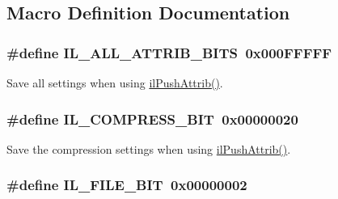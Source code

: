 \subsection{Macro Definition Documentation}
\hypertarget{group__il__bits_ga7e0d7d1e541cc94a58709ca8fe2924c1}{
\subsubsection[{I\+L\+\_\+\+A\+L\+L\+\_\+\+A\+T\+T\+R\+I\+B\+\_\+\+B\+I\+T\+S}]{\setlength{\rightskip}{0pt plus 5cm}\#define I\+L\+\_\+\+A\+L\+L\+\_\+\+A\+T\+T\+R\+I\+B\+\_\+\+B\+I\+T\+S~0x000\+F\+F\+F\+F\+F}}\label{group__il__bits_ga7e0d7d1e541cc94a58709ca8fe2924c1}


Save all settings when using \hyperlink{group__state_ga72e0879c71f59f06c35d2e2a10191fa8}{il\+Push\+Attrib()}. 

\hypertarget{group__il__bits_ga5b13962d3eddb7fdc8274fcb77e2853a}{
\subsubsection[{I\+L\+\_\+\+C\+O\+M\+P\+R\+E\+S\+S\+\_\+\+B\+I\+T}]{\setlength{\rightskip}{0pt plus 5cm}\#define I\+L\+\_\+\+C\+O\+M\+P\+R\+E\+S\+S\+\_\+\+B\+I\+T~0x00000020}}\label{group__il__bits_ga5b13962d3eddb7fdc8274fcb77e2853a}


Save the compression settings when using \hyperlink{group__state_ga72e0879c71f59f06c35d2e2a10191fa8}{il\+Push\+Attrib()}. 

\hypertarget{group__il__bits_ga7372508cfb8193d144e82b117a9bf603}{
\subsubsection[{I\+L\+\_\+\+F\+I\+L\+E\+\_\+\+B\+I\+T}]{\setlength{\rightskip}{0pt plus 5cm}\#define I\+L\+\_\+\+F\+I\+L\+E\+\_\+\+B\+I\+T~0x00000002}}\label{group__il__bits_ga7372508cfb8193d144e82b117a9bf603}


